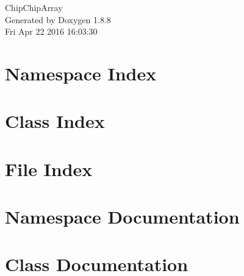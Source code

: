 \documentclass[twoside]{book}
\newcommand{\+}{\discretionary{\mbox{\scriptsize$\hookleftarrow$}}{}{}}
\newcommand{\clearemptydoublepage}{%
  \newpage{\pagestyle{empty}\cleardoublepage}%
}
\begin{document}
\hypersetup{pageanchor=false,
             bookmarks=true,
             bookmarksnumbered=true,
             pdfencoding=unicode
            }
\begin{titlepage}
\vspace*{7cm}
\begin{center}%
{\Large Chip\+Chip\+Array }\\
\vspace*{1cm}
{\large Generated by Doxygen 1.8.8}\\
\vspace*{0.5cm}
{\small Fri Apr 22 2016 16:03:30}\\
\end{center}
\end{titlepage}
\clearemptydoublepage
\tableofcontents
\clearemptydoublepage
{}
\hypersetup{pageanchor=true}

\chapter{Namespace Index}

\chapter{Class Index}

\chapter{File Index}

\chapter{Namespace Documentation}


\chapter{Class Documentation}






\end{document}
